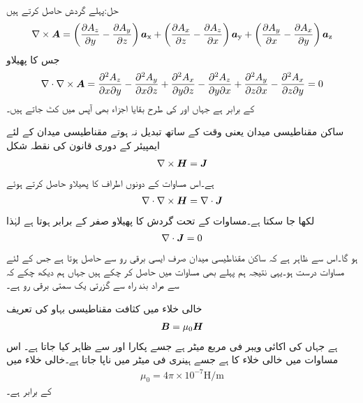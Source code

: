 حل:پہلے گردش حاصل کرتے ہیں
\begin{align*}
\nabla \times {\ensuremath{{\boldsymbol{A}}}}=\left(\frac{\partial A_z}{\partial y}-\frac{\partial A_y}{\partial z} \right){\boldsymbol{a}}_{\textup{x}}+\left(\frac{\partial A_x}{\partial z}-\frac{\partial A_z}{\partial x} \right){\boldsymbol{a}}_{\textup{y}}+\left(\frac{\partial A_y}{\partial x}-\frac{\partial A_x}{\partial y} \right){\boldsymbol{a}}_{\textup{z}}
\end{align*}
جس کا پھیلاو
\begin{align*}
\nabla \cdot \nabla \times {\ensuremath{{\boldsymbol{A}}}}=\frac{\partial^2 A_z}{\partial x \partial y}-\frac{\partial^2 A_y}{\partial x \partial z}+\frac{\partial^2 A_x}{\partial y \partial z}-\frac{\partial^2 A_z}{\partial y \partial x}+\frac{\partial^2 A_y}{\partial z \partial x}-\frac{\partial^2 A_x}{\partial z \partial y}=0
\end{align*}
کے برابر ہے جہاں  اور  کی طرح بقایا اجزاء بھی آپس میں کٹ جاتے ہیں۔

ساکن مقناطیسی میدان یعنی وقت کے ساتھ تبدیل نہ ہوتے مقناطیسی میدان کے لئے ایمپیئر کے دوری قانون کی نقطہ شکل
\begin{align*}
\nabla \times {\ensuremath{{\boldsymbol{H}}}}={{\boldsymbol{J}}}
\end{align*}
ہے۔اس مساوات کے دونوں اطراف کا پھیلاو حاصل کرتے ہوئے
\begin{align*}
\nabla \cdot \nabla \times {\ensuremath{{\boldsymbol{H}}}}=\nabla \cdot {\ensuremath{{\boldsymbol{J}}}}
\end{align*}
لکھا جا سکتا ہے۔مساوات  کے تحت گردش کا پھیلاو صفر کے برابر ہوتا ہے لہٰذا
\begin{align}\label{مساوات_مقناطیسی_استمراری_مساوات}
\nabla \cdot {\ensuremath{{\boldsymbol{J}}}}=0
\end{align}
ہو گا۔اس سے ظاہر ہے کہ ساکن مقناطیسی میدان صرف ایسی برقی رو سے حاصل ہوتا ہے  جس کے لئے مساوات  درست ہو۔یہی نتیجہ ہم پہلے بھی مساوات  میں حاصل کر چکے ہیں جہاں ہم دیکھ چکے کہ  سے مراد بند راہ سے گزرتی  یک سمتی برقی رو ہے۔

خالی خلاء میں کثافت مقناطیسی بہاو  کی تعریف
\begin{align}\label{مساوات_مقناطیسی_میدان_بالمقابل_شدت}
{\ensuremath{{\boldsymbol{B}}}}=\mu_0 {{\boldsymbol{H}}}
\end{align}
ہے جہاں  کی اکائی ویبر فی مربع میٹر  ہے جسے  پکارا اور  سے ظاہر کیا جاتا ہے۔ اس مساوات میں  خالی خلاء کا  ہے جسے ہینری فی میٹر  میں ناپا جاتا ہے۔خالی خلاء میں
\begin{align}
\mu_0=4\pi \times 10^{-7} \si{\henry \per \meter}
\end{align}
کے برابر ہے۔

